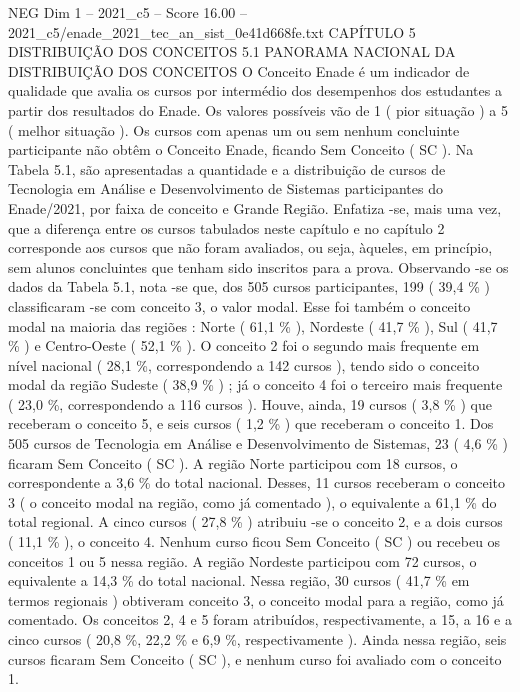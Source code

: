 \begin{textsample}{NEG Dim 1 – 2021\_c5 – Score 16.00 – 2021\_c5/enade\_2021\_tec\_an\_sist\_0e41d668fe.txt}  \label{ex:f1_neg_402}
CAPÍTULO 5 DISTRIBUIÇÃO DOS CONCEITOS 5.1 PANORAMA NACIONAL DA DISTRIBUIÇÃO DOS CONCEITOS O Conceito Enade é um indicador de qualidade que avalia os cursos por intermédio dos desempenhos dos estudantes a partir dos resultados do Enade.
Os valores possíveis vão de 1 ( pior situação ) a 5 ( melhor situação ).
Os cursos com apenas um ou sem nenhum concluinte participante não obtêm o Conceito Enade, ficando Sem Conceito ( SC ).
Na Tabela 5.1, são apresentadas a quantidade e a distribuição de cursos de Tecnologia em Análise e Desenvolvimento de Sistemas participantes do Enade/2021, por faixa de conceito e Grande Região.
Enfatiza -se, mais uma vez, que a diferença entre os cursos tabulados neste capítulo e no capítulo 2 corresponde aos cursos que não foram avaliados, ou seja, àqueles, em princípio, sem alunos concluintes que tenham sido inscritos para a prova.
Observando -se os dados da Tabela 5.1, nota -se que, dos 505 cursos participantes, 199 ( 39,4 \% ) classificaram -se com conceito 3, o valor modal.
Esse foi também o conceito modal na maioria das regiões : Norte ( 61,1 \% ), Nordeste ( 41,7 \% ), Sul ( 41,7 \% ) e Centro-Oeste ( 52,1 \% ).
O conceito 2 foi o segundo mais frequente em nível nacional ( 28,1 \%, correspondendo a 142 cursos ), tendo sido o conceito modal da região Sudeste ( 38,9 \% ) ; já o conceito 4 foi o terceiro mais frequente ( 23,0 \%, correspondendo a 116 cursos ).
Houve, ainda, 19 cursos ( 3,8 \% ) que receberam o conceito 5, e seis cursos ( 1,2 \% ) que receberam o conceito 1.
Dos 505 cursos de Tecnologia em Análise e Desenvolvimento de Sistemas, 23 ( 4,6 \% ) ficaram Sem Conceito ( SC ).
A região Norte participou com 18 cursos, o correspondente a 3,6 \% do total nacional.
Desses, 11 cursos receberam o conceito 3 ( o conceito modal na região, como já comentado ), o equivalente a 61,1 \% do total regional.
A cinco cursos ( 27,8 \% ) atribuiu -se o conceito 2, e a dois cursos ( 11,1 \% ), o conceito 4.
Nenhum curso ficou Sem Conceito ( SC ) ou recebeu os conceitos 1 ou 5 nessa região.
A região Nordeste participou com 72 cursos, o equivalente a 14,3 \% do total nacional.
Nessa região, 30 cursos ( 41,7 \% em termos regionais ) obtiveram conceito 3, o conceito modal para a região, como já comentado.
Os conceitos 2, 4 e 5 foram atribuídos, respectivamente, a 15, a 16 e a cinco cursos ( 20,8 \%, 22,2 \% e 6,9 \%, respectivamente ).
Ainda nessa região, seis cursos ficaram Sem Conceito ( SC ), e nenhum curso foi avaliado com o conceito 1.

\end{textsample}
